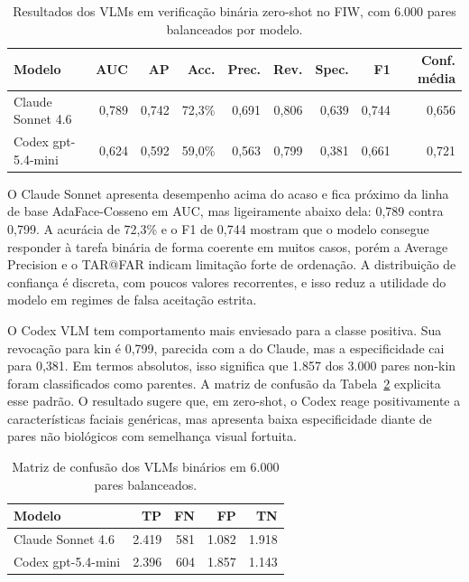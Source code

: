 \begin{table}[h]
\centering
\scriptsize
\setlength{\tabcolsep}{3pt}
\caption{Resultados dos VLMs em verificação binária zero-shot no FIW, com 6.000 pares balanceados por modelo.}
\label{tab:vlm_binario_resultados}
\begin{tabular}{lrrrrrrrr}
\hline
\textbf{Modelo} & \textbf{AUC} & \textbf{AP} & \textbf{Acc.} & \textbf{Prec.} & \textbf{Rev.} & \textbf{Spec.} & \textbf{F1} & \textbf{Conf. média} \\
\hline
Claude Sonnet 4.6 & 0{,}789 & 0{,}742 & 72{,}3\% & 0{,}691 & 0{,}806 & 0{,}639 & 0{,}744 & 0{,}656 \\
Codex gpt-5.4-mini & 0{,}624 & 0{,}592 & 59{,}0\% & 0{,}563 & 0{,}799 & 0{,}381 & 0{,}661 & 0{,}721 \\
\hline
\end{tabular}
\end{table}

O Claude Sonnet apresenta desempenho acima do acaso e fica próximo da linha de base AdaFace-Cosseno em AUC, mas ligeiramente abaixo dela: 0,789 contra 0,799. A acurácia de 72,3\% e o F1 de 0,744 mostram que o modelo consegue responder à tarefa binária de forma coerente em muitos casos, porém a Average Precision e o TAR@FAR indicam limitação forte de ordenação. A distribuição de confiança é discreta, com poucos valores recorrentes, e isso reduz a utilidade do modelo em regimes de falsa aceitação estrita.

O Codex VLM tem comportamento mais enviesado para a classe positiva. Sua revocação para kin é 0,799, parecida com a do Claude, mas a especificidade cai para 0,381. Em termos absolutos, isso significa que 1.857 dos 3.000 pares non-kin foram classificados como parentes. A matriz de confusão da Tabela~\ref{tab:vlm_confusao_binaria} explicita esse padrão. O resultado sugere que, em zero-shot, o Codex reage positivamente a características faciais genéricas, mas apresenta baixa especificidade diante de pares não biológicos com semelhança visual fortuita.

\begin{table}[h]
\centering
\small
\setlength{\tabcolsep}{5pt}
\caption{Matriz de confusão dos VLMs binários em 6.000 pares balanceados.}
\label{tab:vlm_confusao_binaria}
\begin{tabular}{lrrrr}
\hline
\textbf{Modelo} & \textbf{TP} & \textbf{FN} & \textbf{FP} & \textbf{TN} \\
\hline
Claude Sonnet 4.6 & 2.419 & 581 & 1.082 & 1.918 \\
Codex gpt-5.4-mini & 2.396 & 604 & 1.857 & 1.143 \\
\hline
\end{tabular}
\end{table}

